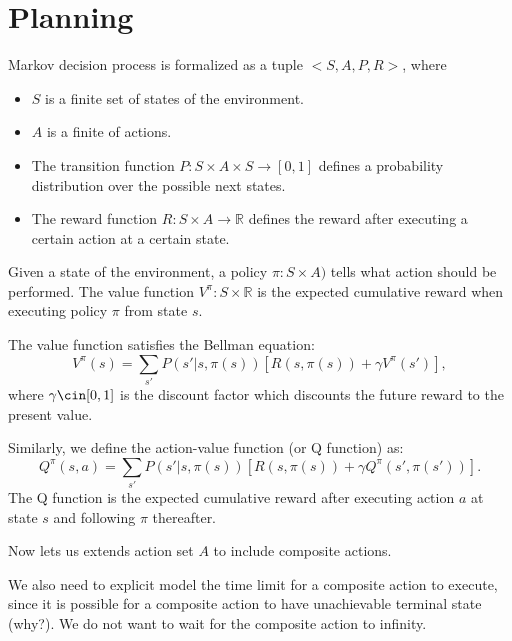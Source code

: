 \chapter{Planning}


\begin{definition} Markov decision process is formalized as a tuple $<S, A, P, R>$, where
\begin{itemize}{}
\item $S$ is a finite set of states of the environment.
\item $A$ is a finite of actions.
\item The transition function $P:S \times A \times S \rightarrow [0, 1]$ defines a probability distribution over the possible next states. 
\item The reward function $R:S \times A \rightarrow \mathbb{R}$ defines the reward after executing a certain action at a certain state.
\end{itemize}
\end{definition}

Given a state of the environment, a policy $\pi: S \times A)$ tells what action should be performed. 
The value function $V^{\pi}: S \times \mathbb{R}$ is the expected cumulative reward when executing
policy $\pi$ from state $s$.

The value function satisfies the Bellman equation:
\begin{equation}
    V^{\pi}(s) = \sum_{s'}P(s'|s, \pi(s))[R(s, \pi(s)) + \gamma V^{\pi}(s')],
\end{equation}
where $\gamma \cin [0, 1]$ is the discount factor which discounts the future reward to the present value.

Similarly, we define the action-value function (or Q function) as:
\begin{equation}
    Q^{\pi}(s, a) = \sum_{s'}P(s'|s, \pi(s))[R(s, \pi(s)) + \gamma Q^{\pi}(s', \pi(s'))].
\end{equation}
The Q function is the expected cumulative reward after executing action $a$ at state $s$ and following
$\pi$ thereafter.

Now lets us extends action set $A$ to include composite actions.

We also need to explicit model the time limit for a composite action to execute, since it
is possible for a composite action to have unachievable terminal state (why?). We do not want 
to wait for the composite action to infinity.

